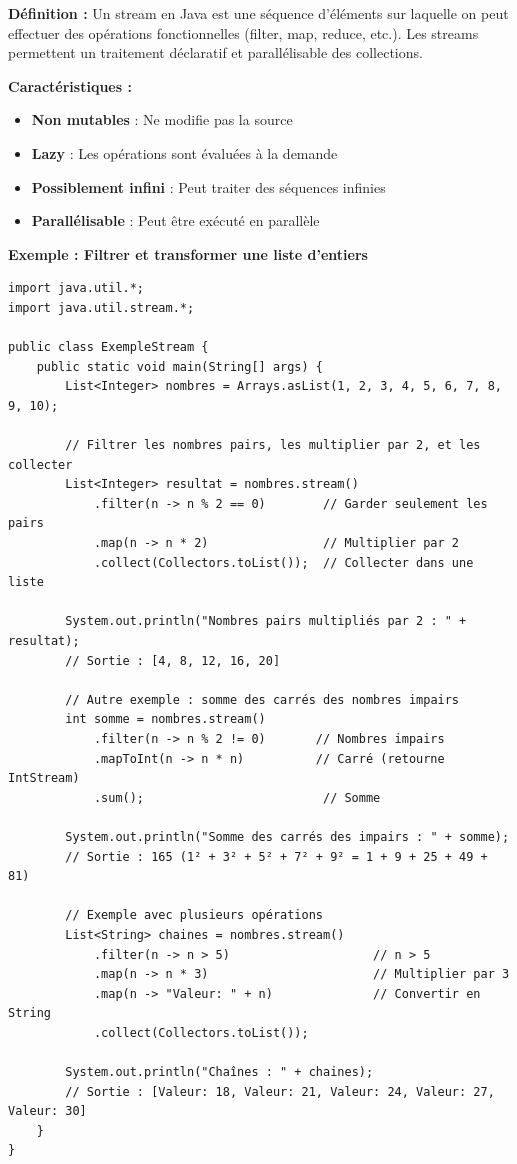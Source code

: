 \documentclass[11pt,a4paper]{article}
\begin{document}
\begin{correctionbox}
\textbf{Définition :} Un stream en Java est une séquence d'éléments sur laquelle on peut effectuer des opérations fonctionnelles (filter, map, reduce, etc.). Les streams permettent un traitement déclaratif et parallélisable des collections.

\textbf{Caractéristiques :}
\begin{itemize}
    \item \textbf{Non mutables} : Ne modifie pas la source
    \item \textbf{Lazy} : Les opérations sont évaluées à la demande
    \item \textbf{Possiblement infini} : Peut traiter des séquences infinies
    \item \textbf{Parallélisable} : Peut être exécuté en parallèle
\end{itemize}

\textbf{Exemple : Filtrer et transformer une liste d'entiers}

\begin{lstlisting}
import java.util.*;
import java.util.stream.*;

public class ExempleStream {
    public static void main(String[] args) {
        List<Integer> nombres = Arrays.asList(1, 2, 3, 4, 5, 6, 7, 8, 9, 10);
        
        // Filtrer les nombres pairs, les multiplier par 2, et les collecter
        List<Integer> resultat = nombres.stream()
            .filter(n -> n % 2 == 0)        // Garder seulement les pairs
            .map(n -> n * 2)                // Multiplier par 2
            .collect(Collectors.toList());  // Collecter dans une liste
        
        System.out.println("Nombres pairs multipliés par 2 : " + resultat);
        // Sortie : [4, 8, 12, 16, 20]
        
        // Autre exemple : somme des carrés des nombres impairs
        int somme = nombres.stream()
            .filter(n -> n % 2 != 0)       // Nombres impairs
            .mapToInt(n -> n * n)          // Carré (retourne IntStream)
            .sum();                         // Somme
        
        System.out.println("Somme des carrés des impairs : " + somme);
        // Sortie : 165 (1² + 3² + 5² + 7² + 9² = 1 + 9 + 25 + 49 + 81)
        
        // Exemple avec plusieurs opérations
        List<String> chaines = nombres.stream()
            .filter(n -> n > 5)                    // n > 5
            .map(n -> n * 3)                       // Multiplier par 3
            .map(n -> "Valeur: " + n)              // Convertir en String
            .collect(Collectors.toList());
        
        System.out.println("Chaînes : " + chaines);
        // Sortie : [Valeur: 18, Valeur: 21, Valeur: 24, Valeur: 27, Valeur: 30]
    }
}
\end{lstlisting}
\end{correctionbox}
\end{document}
